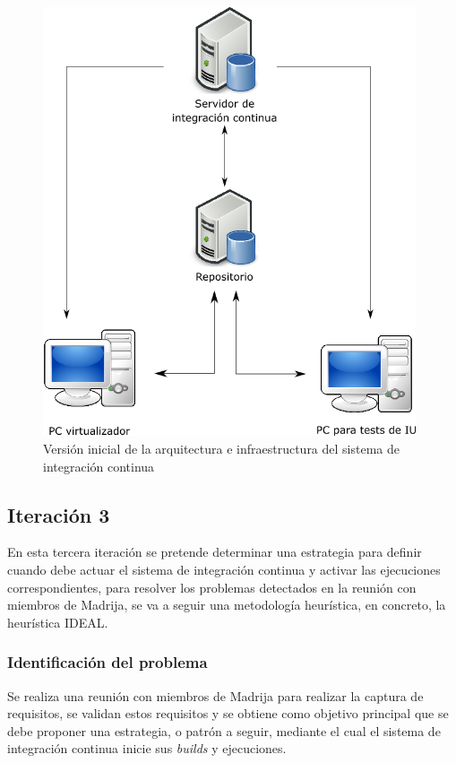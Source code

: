\begin{figure}[!h]
\centering
   \includegraphics[width=11cm]{Arquitectura_Infraestructura_IC.png}
\caption{Versión inicial de la arquitectura e infraestructura del sistema de integración continua}
\end{figure}

\subsection{Iteración 3}

En esta tercera iteración se pretende determinar una estrategia para definir cuando debe actuar el sistema de integración continua y activar las ejecuciones correspondientes, para resolver los problemas detectados en la reunión con miembros de \ac{Madrija}, se va a seguir una metodología heurística, en concreto, la heurística IDEAL.

\subsubsection{Identificación del problema}

Se realiza una reunión con miembros de \ac{Madrija} para realizar la captura de requisitos, se validan estos requisitos y se obtiene como objetivo principal que se debe proponer una estrategia, o patrón a seguir, mediante el cual el sistema de integración continua inicie sus \textit{builds} y ejecuciones.

